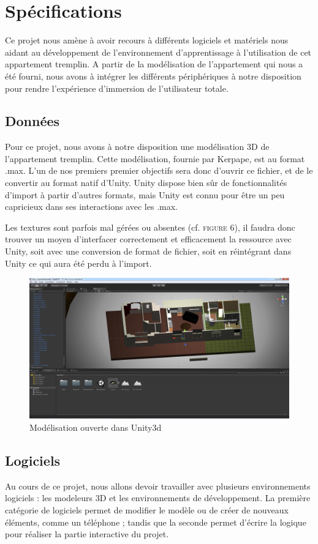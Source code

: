 \section{Spécifications}
	Ce projet nous amène à avoir recours à différents logiciels et matériels nous aidant au développement de l'environnement d'apprentissage à l'utilisation de cet appartement tremplin. A partir de la modélisation de l'appartement qui nous a été fourni, nous avons à intégrer les différents périphériques à notre disposition pour rendre l'expérience d'immersion de l'utilisateur totale.

\subsection{Données}
	Pour ce projet, nous avons à notre disposition une modélisation 3D de l'appartement tremplin. Cette modélisation, fournie par Kerpape, est au format .max. L'un de nos premiers premier objectifs sera donc d'ouvrir ce fichier, et de le convertir au format natif d'Unity. Unity dispose bien sûr de fonctionnalités d'import à partir d'autres formats, mais Unity est connu pour être un peu capricieux dans ses interactions avec les .max.

	Les textures sont parfois mal gérées ou absentes (cf. \textsc{figure 6}), il faudra donc trouver un moyen d'interfacer correctement et efficacement la ressource avec Unity, soit avec une conversion de format de fichier, soit en réintégrant dans Unity ce qui aura été perdu à l'import.
	\begin{figure}[h]
		\centering
		\includegraphics[width=\textwidth]{1-PreEtude/img/appart_unity}
		\caption{Modélisation ouverte dans Unity3d}
	\end{figure}

\subsection{Logiciels}
	Au cours de ce projet, nous allons devoir travailler avec plusieurs environnements logiciels : les modeleurs 3D et les environnements de développement. La première catégorie de logiciels permet de modifier le modèle ou de créer de nouveaux éléments, comme un téléphone ; tandis que la seconde permet d'écrire la logique pour réaliser la partie interactive du projet.

